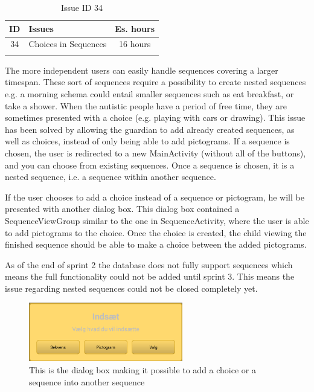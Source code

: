 \begin{longtable} { | c | p{12cm} | c | } 
\hline
	ID 	&	Issues	&		 Es. hours \\\hline
	34 	&	Choices in Sequences		&	16 hours \\\hline
\caption{Issue ID 34}
\label{tab:spr2_nested}
\end{longtable}

The more independent users can easily handle sequences covering a larger timespan. These sort of sequences require a possibility to create nested sequences e.g. a morning schema could entail smaller sequences such as eat breakfast, or take a shower. When the autistic people have a period of free time, they are sometimes presented with a choice (e.g. playing with cars or drawing).
This issue has been solved by allowing the guardian to add already created sequences, as well as choices, instead of only being able to add pictograms. If a sequence is chosen, the user is redirected to a new MainActivity (without all of the buttons), and you can choose from existing sequences. Once a sequence is chosen, it is a nested sequence, i.e. a sequence within another sequence. 

If the user chooses to add a choice instead of a sequence or pictogram, he will be presented with another dialog box. This dialog box contained a SequenceViewGroup similar to the one in SequenceActivity, where the user is able to add pictograms to the choice. Once the choice is created, the child viewing the finished sequence should be able to make a choice between the added pictograms.

As of the end of sprint 2 the database does not fully support sequences which means the full functionality could not be added until sprint 3. This means the issue regarding nested sequences could not be closed completely yet.

\begin{figure} [h!]
\centering
\includegraphics[width=0.6\textwidth]{Pics/Sprint2/dialogs/magicAdd.png}
\caption{This is the dialog box making it possible to add a choice or a sequence into another sequence}
\label{fig:addDialog}
\end{figure}




